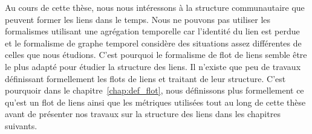 Au cours de cette thèse, nous nous intéressons à la structure communautaire que peuvent former les liens dans le temps.
Nous ne pouvons pas utiliser les formalismes utilisant une agrégation temporelle car l'identité du lien est perdue et le formalisme de graphe temporel considère des situations assez différentes de celles que nous étudions.
C'est pourquoi le formalisme de flot de liens semble être le plus adapté pour étudier la structure des liens.
Il n'existe que peu de travaux définissant formellement les flots de liens et traitant de leur structure.
C'est pourquoir dans le chapitre~\ref{chap:def_flot}, nous définissons plus formellement ce qu'est un flot de liens ainsi que les métriques utilisées tout au long de cette thèse avant de présenter nos travaux sur la structure des liens dans les chapitres suivants.


